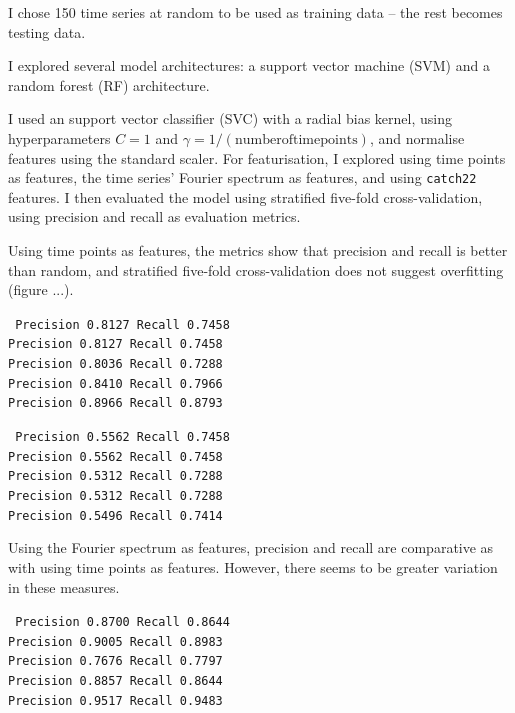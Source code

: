 
I chose 150 time series at random to be used as training data -- the rest becomes testing data.


I explored several model architectures: a support vector machine (SVM) and a random forest (RF) architecture.

I used an support vector classifier (SVC) with a radial bias kernel, using hyperparameters $C = 1$ and $\gamma = 1/(\mathrm{number of time points})$, and normalise features using the standard scaler.
For featurisation, I explored using time points as features, the time series' Fourier spectrum as features, and using \texttt{catch22} features.
I then evaluated the model using stratified five-fold cross-validation, using precision and recall as evaluation metrics.

Using time points as features, the metrics show that precision and recall is better than random, and stratified
five-fold cross-validation does not suggest overfitting (figure ...).

\texttt{
     Precision 0.8127 Recall 0.7458\\
     Precision 0.8127 Recall 0.7458\\
     Precision 0.8036 Recall 0.7288\\
     Precision 0.8410 Recall 0.7966\\
     Precision 0.8966 Recall 0.8793\\
}

\texttt{
     Precision 0.5562 Recall 0.7458\\
     Precision 0.5562 Recall 0.7458\\
     Precision 0.5312 Recall 0.7288\\
     Precision 0.5312 Recall 0.7288\\
     Precision 0.5496 Recall 0.7414\\
}

Using the Fourier spectrum as features, precision and recall are comparative as with using time points as
features.
However, there seems to be greater variation in these measures.

\texttt{
     Precision 0.8700 Recall 0.8644\\
     Precision 0.9005 Recall 0.8983\\
     Precision 0.7676 Recall 0.7797\\
     Precision 0.8857 Recall 0.8644\\
     Precision 0.9517 Recall 0.9483\\
}

